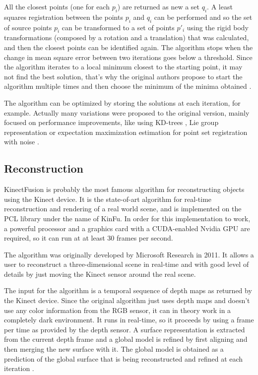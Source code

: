 \documentclass[msc, a4paper, classic, en]{ufbathesis}
\begin{document}
All the closest points (one for each $p_i$) are returned as new a set ${q_i}$. A least squares registration between the points $p_i$ and $q_i$ can be performed and so the set of source points $p_i$ can be transformed to a set of points $p'_i$ using the rigid body transformations (composed by a rotation and a translation) that was calculated, and then the closest points can be identified again. The algorithm stops when the change in mean square error between two iterations goes below a threshold. Since the algorithm iterates to a local minimum closest to the starting point, it may not find the best solution, that's why the original authors propose to start the algorithm multiple times and then choose the minimum of the minima obtained \cite{icp}.

The algorithm can be optimized by storing the solutions at each iteration, for example. Actually many variations were proposed to the original version, mainly focused on performance improvements, like using KD-trees \cite{zhang1994}, Lie group representation \cite{Dong201467} or expectation maximization estimation for point set registration with noise \cite{6957732}.

\subsection{Reconstruction}

KinectFusion \cite{kinfu} \cite{kinfu2} is probably the most famous algorithm for reconstructing objects using the Kinect device. It is the state-of-art algorithm for real-time reconstruction and rendering of a real world scene, and is implemented on the PCL \cite{pcl} library under the name of KinFu. In order for this implementation to work, a powerful processor and a graphics card with a CUDA-enabled Nvidia GPU are required, so it can run at at least 30 frames per second.

The algorithm was originally developed by Microsoft Research in 2011. It allows a user to reconstruct a three-dimensional scene in real-time and with good level of details by just moving the Kinect sensor around the real scene.

The input for the algorithm is a temporal sequence of depth maps as returned by the Kinect device. Since the original algorithm just uses depth maps and doesn't use any color information from the RGB sensor, it can in theory work in a completely dark environment. It runs in real-time, so it proceeds by using a frame per time as provided by the depth sensor. A surface representation is extracted from the current depth frame and a global model is refined by first aligning and then merging the new surface with it. The global model is obtained as a prediction of the global surface that is being reconstructed and refined at each iteration \cite{michele}.
\end{document}
